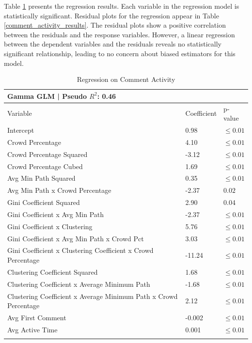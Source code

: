 Table \ref{comment_activity_regression} presents the regression results. Each variable in the regression model is statistically significant. Residual plots for the regression appear in Table \ref{comment_activity_results}. The residual plots show a positive correlation between the residuals and the response variables. However, a linear regression between the dependent variables and the residuals reveals no statistically significant relationship, leading to no concern about biased estimators for this model.

\begin{table}
\caption{Regression on Comment Activity}
\label{comment_activity_regression}
\begin{tabular}{lll}
Gamma GLM | Pseudo $R^2$: 0.46 \\
\hline\noalign{\smallskip}
Variable & Coefficient & p-value  \\
\noalign{\smallskip}\hline\noalign{\smallskip}
Intercept & 0.98 & $\leq 0.01$ \\
Crowd Percentage & 4.10 & $\leq 0.01$ \\
Crowd Percentage Squared & -3.12 & $\leq 0.01$ \\
Crowd Percentage Cubed & 1.69 & $\leq 0.01$ \\
Avg Min Path Squared & 0.35 & $\leq 0.01$ \\
Avg Min Path x Crowd Percentage &  -2.37 & $0.02$ \\
Gini Coefficient Squared & 2.90 & 0.04 \\
Gini Coefficient x Avg Min Path & -2.37 & $\leq 0.01$ \\
Gini Coefficient x Clustering & 5.76 & $\leq 0.01$ \\
Gini Coefficient x Avg Min Path x Crowd Pct & 3.03 & $\leq 0.01$ \\
Gini Coefficient x Clustering Coefficient x Crowd Percentage & -11.24 & $\leq 0.01$ \\
Clustering Coefficient Squared & 1.68 & $\leq 0.01$ \\
Clustering Coefficient x Average Minimum Path & -1.68 & $\leq 0.01$ \\
Clustering Coefficient x Average Minimum Path x Crowd Percentage & 2.12 & $\leq 0.01$ \\
Avg First Comment & -0.002 & $\leq 0.01$ \\
Avg Active Time & 0.001 & $\leq 0.01$ \\
\noalign{\smallskip}\hline
\end{tabular}
\end{table}

